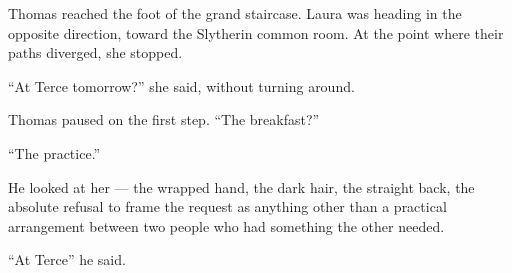 Thomas reached the foot of the grand staircase. Laura was heading in the opposite direction, toward the Slytherin common room. At the point where their paths diverged, she stopped.
 
\enquote{At Terce tomorrow?} she said, without turning around.
 
Thomas paused on the first step. \enquote{The breakfast?}
 
\enquote{The practice.}
 
He looked at her --- the wrapped hand, the dark hair, the straight back, the absolute refusal to frame the request as anything other than a practical arrangement between two people who had something the other needed.
 
\enquote{At Terce} he said.
 

 


























































